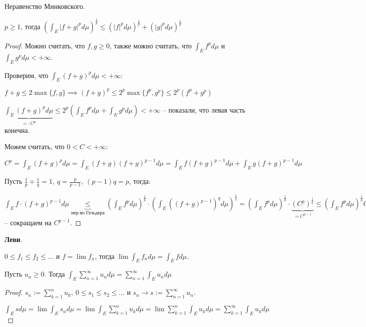 \begin{properties}
    Неравенство Минковского.

    $p \geq 1$, тогда $\left(\int_E |f + g|^p d \mu\right)^{\frac{1}{p}} \leq \left( |f|^p d \mu \right)^{\frac{1}{p}} + \left( |g|^p d \mu \right)^{\frac{1}{p}}$
\end{properties}
\begin{proof}
    Можно считать, что $f, g \geq 0$, также можно считать, что $\int_E f^p d \mu$ и $\int_E g^p d \mu < +\infty$.

    Проверим, что $\int_E (f + g)^p d \mu < +\infty$:
    
    $f + g \leq 2 \max \{ f, g \} \implies (f + g)^p \leq 2^p \max\{ f^p, g^p \} \leq 2^p (f^p + g^p)$

    $\underbrace{\int_E (f + g)^p d \mu}_{=: C^p} \leq 2^p \left(\int_E f^p d \mu + \int_E g^p d \mu \right) < +\infty$ -- показали, что левая часть конечна.

    Можем считать, что $0 < C < +\infty$:
    
    $C^p = \int_E (f+g)^p d \mu = \int_E (f + g) (f + g)^{p - 1} d \mu = \int_E f (f+g)^{p-1} d \mu + \int_E g (f + g)^{p - 1} d \mu$


    Пусть $\frac{1}{p} + \frac{1}{q} = 1, \ q = \frac{p}{p-1}, \ (p - 1) q = p$, тогда:

    $\int_E{f \cdot (f + g)^{p - 1} d \mu} \underbrace{\leq}_{\text{нер-во Гельдера}} \left(\int_E f^p d \mu\right)^{\frac{1}{p}} \cdot \left(\int_E ((f+g)^{p-1})^{q} d \mu\right)^{\frac{1}{q}} = \left(\int_E f^p d \mu\right)^{\frac{1}{p}} \cdot \underbrace{\left(C^p\right)^{\frac{1}{q}}}_{= C^{p - 1}} \leq \left( \int_E f^p d \mu \right)^{\frac{1}{p}} C^{p - 1} + \left(\int_E g^p d \mu\right)^{\frac{1}{p}} \cdot C^{p - 1}$ -- сокращаем на $C^{p - 1}$.
\end{proof}

\begin{theorem}
    \textbf{Леви}.

    $0 \leq f_1 \leq f_2 \leq \dots$ и $f = \lim{f_n}$, тогда $\lim{\int_E{f_n d \mu}} = \int_E f d \mu$.
\end{theorem}
\begin{consequence}
    Пусть $u_n \geq 0.$ Тогда $\int_E {\sum_{n=1}^{\infty} u_n d \mu} = \sum_{n=1}^{\infty} \int_E {u_n d \mu}$
\end{consequence}
\begin{proof}
    $s_n := \sum_{k=1}^{n} u_k, \ 0 \leq s_1 \leq s_2 \leq \dots$ и $s_n \rightarrow s := \sum_{n=1}^{\infty} u_n$.

    $\int_E{s d \mu} = \lim{\int_E{s_n d \mu}} = \lim{\int_E{\sum_{k=1}^{n} u_k d \mu}} = \lim{\sum_{k=1}^{n} \int_E{u_k d \mu}} = \sum_{k=1}^{\infty} \int_E{u_k d \mu}$
\end{proof}

